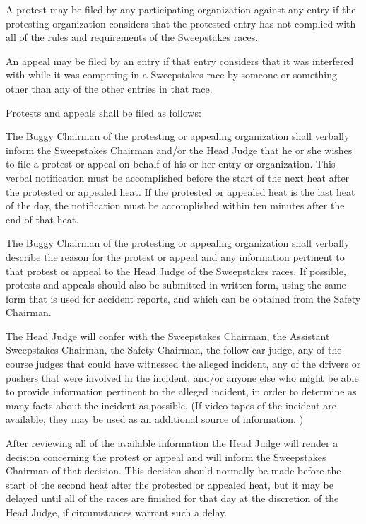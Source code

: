 	A protest may be filed by any participating organization against any entry if
	the protesting organization considers that the protested entry has not complied
	with all of the rules and requirements of the Sweepstakes races.

	An appeal may be filed by an entry if that entry considers that it was
	interfered with while it was competing in a Sweepstakes race by someone or
	something other than any of the other entries in that race.

	Protests and appeals shall be filed as follows:

	The Buggy Chairman of the protesting or appealing organization shall verbally
	inform the Sweepstakes Chairman and/or the Head Judge that he or she wishes to
	file a protest or appeal on behalf of his or her entry or organization. This
	verbal notification must be accomplished before the start of the next heat
	after the protested or appealed heat. If the protested or appealed heat is the
	last heat of the day, the notification must be accomplished within ten minutes
	after the end of that heat.

	The Buggy Chairman of the protesting or appealing organization shall verbally
	describe the reason for the protest or appeal and any information pertinent to
	that protest or appeal to the Head Judge of the Sweepstakes races. If possible,
	protests and appeals should also be submitted in written form, using the same
	form that is used for accident reports, and which can be obtained from the
	Safety Chairman.

	The Head Judge will confer with the Sweepstakes Chairman, the Assistant
	Sweepstakes Chairman, the Safety Chairman, the follow car judge, any of the
	course judges that could have witnessed the alleged incident, any of the
	drivers or pushers that were involved in the incident, and/or anyone else who
	might be able to provide information pertinent to the alleged incident, in
	order to determine as many facts about the incident as possible. (If video
	tapes of the incident are available, they may be used as an additional source
	of information. )

	After reviewing all of the available information the Head Judge will render a
	decision concerning the protest or appeal and will inform the Sweepstakes
	Chairman of that decision. This decision should normally be made before the
	start of the second heat after the protested or appealed heat, but it may be
	delayed until all of the races are finished for that day at the discretion of
	the Head Judge, if circumstances warrant such a delay.


